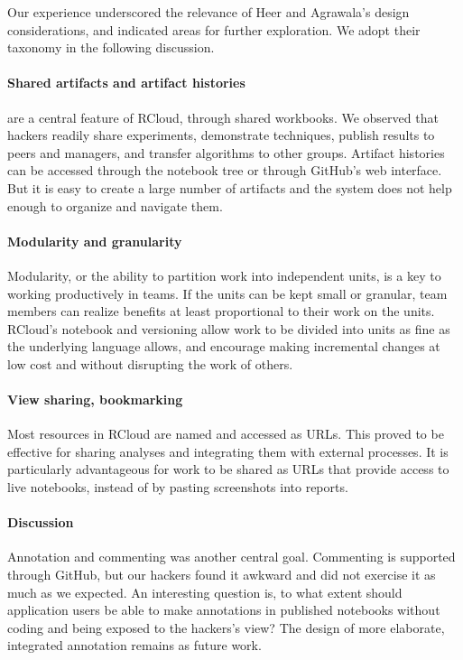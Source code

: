 Our experience underscored the relevance of Heer and Agrawala's design
considerations, and indicated areas for further exploration. We adopt
their taxonomy in the following discussion.

\paragraph*{Shared artifacts and artifact histories} are a central feature
of RCloud, through shared workbooks. We observed that hackers readily
share experiments, demonstrate techniques, publish results to peers and
managers, and transfer algorithms to other groups. Artifact histories
can be accessed through the notebook tree or through GitHub's web interface.
But it is easy to create a large number of artifacts
and the system does not help enough to organize and navigate them.

\paragraph*{Modularity and granularity} Modularity, or the ability
to partition work into independent units, is a key to working
productively in teams.
If the units can be kept small or granular, team members
can realize benefits at least proportional to their work on the units.
RCloud's notebook and versioning allow work to be divided
into units as fine as the underlying language allows, and
encourage making incremental changes at low cost and without disrupting
the work of others.

\paragraph*{View sharing, bookmarking} Most resources in RCloud are named
and accessed as URLs. This proved to be effective for sharing analyses
and integrating them with external processes.  It is particularly
advantageous for work to be shared as URLs that provide access to live
notebooks, instead of by pasting screenshots into reports.

\paragraph*{Discussion} Annotation and commenting was another central goal.
Commenting is supported through GitHub, but our hackers found it
awkward and did not exercise it as much as we expected.
An interesting question is, to what extent should application users
be able to make annotations in published notebooks without coding
and being exposed to the hackers's view? The design of
more elaborate, integrated annotation remains as future work.

